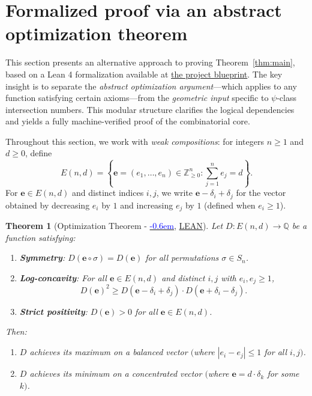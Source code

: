 \documentclass[12pt,reqno]{amsart}
\newtheorem{theorem}{Theorem}[section]
\theoremstyle{definition}
\newcommand\doublecheck{\textcolor{blue}{\checked\kern-0.6em\checked}}
\newcommand{\ee}{\mathbf{e}}
\newcommand{\ZZ}{\mathbb{Z}}
\newcommand{\QQ}{\mathbb{Q}}
\begin{document}
\section{Formalized proof via an abstract optimization theorem}\label{sec:formalized}

\begin{aiparagraph}
This section presents an alternative approach to proving Theorem~\ref{thm:main}, based on a Lean 4 formalization available at \href{https://schmittj.github.io/balanced-vectors-blueprint/index.html}{the project blueprint}. The key insight is to separate the \emph{abstract optimization argument}---which applies to any function satisfying certain axioms---from the \emph{geometric input} specific to $\psi$-class intersection numbers. This modular structure clarifies the logical dependencies and yields a fully machine-verified proof of the combinatorial core.

Throughout this section, we work with \emph{weak compositions}: for integers $n \geq 1$ and $d \geq 0$, define
\[
E(n, d) = \left\{ \ee = (e_1, \ldots, e_n) \in \ZZ_{\geq 0}^n : \sum_{j=1}^n e_j = d \right\}.
\]
For $\ee \in E(n,d)$ and distinct indices $i, j$, we write $\ee - \delta_i + \delta_j$ for the vector obtained by decreasing $e_i$ by $1$ and increasing $e_j$ by $1$ (defined when $e_i \geq 1$).

\begin{theorem}[Optimization Theorem - {\href{https://schmittj.github.io/balanced-vectors-blueprint/sect0001.html\#thm:main}{\doublecheck}},{ \href{https://schmittj.github.io/balanced-vectors-blueprint/docs/BalancedVectors.html\#main_theorem_paper}{LEAN}}]\label{thm:main_theorem_paper} 
Let $D : E(n, d) \to \QQ$ be a function satisfying:
\begin{enumerate}
    \item[\textup{(S)}] \textbf{Symmetry}: $D(\ee \circ \sigma) = D(\ee)$ for all permutations $\sigma \in S_n$.
    \item[\textup{(LC)}] \textbf{Log-concavity}: For all $\ee \in E(n,d)$ and distinct $i, j$ with $e_i, e_j \geq 1$,
    \[
    D(\ee)^2 \geq D(\ee - \delta_i + \delta_j) \cdot D(\ee + \delta_i - \delta_j).
    \]
    \item[\textup{(P)}] \textbf{Strict positivity}: $D(\ee) > 0$ for all $\ee \in E(n,d)$.
\end{enumerate}
Then:
\begin{enumerate}
    \item[\textup{(a)}] $D$ achieves its maximum on a balanced vector $($where $|e_i - e_j| \leq 1$ for all $i, j)$.
    \item[\textup{(b)}] $D$ achieves its minimum on a concentrated vector $($where $\ee = d \cdot \delta_k$ for some $k)$.
\end{enumerate}
\end{theorem}


\end{aiparagraph}
\end{document}
